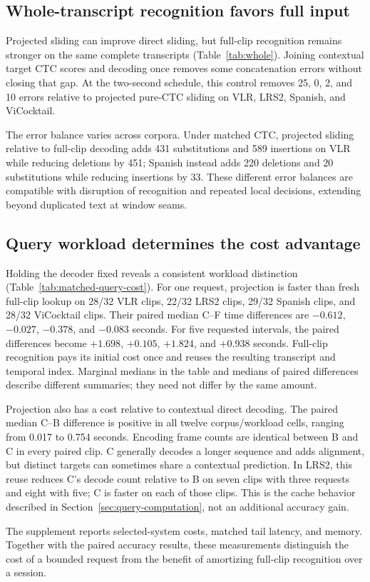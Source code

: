 \subsection{Whole-transcript recognition favors full input}

Projected sliding can improve direct sliding, but full-clip recognition
remains stronger on the same complete transcripts
(Table~\ref{tab:whole}). Joining contextual target CTC scores and decoding
once removes some concatenation errors without closing that gap.
At the two-second schedule, this control removes 25, 0, 2, and 10 errors
relative to projected pure-CTC sliding on VLR, LRS2, Spanish, and ViCocktail.

The error balance varies across corpora. Under matched CTC, projected sliding
relative to full-clip decoding
adds 431 substitutions and 589 insertions on VLR while reducing deletions
by 451; Spanish instead adds 220 deletions and 20 substitutions while reducing
insertions by 33. These different error balances are compatible with disruption
of recognition and repeated local decisions, extending beyond duplicated text
at window seams.

\subsection{Query workload determines the cost advantage}

Holding the decoder fixed reveals a consistent workload distinction
(Table~\ref{tab:matched-query-cost}). For one request, projection is faster
than fresh full-clip lookup on 28/32 VLR clips, 22/32 LRS2 clips, 29/32
Spanish clips, and 28/32 ViCocktail clips. Their paired median C--F time
differences are $-0.612$, $-0.027$, $-0.378$, and $-0.083$ seconds.
For five requested intervals, the paired differences become $+1.698$,
$+0.105$, $+1.824$, and $+0.938$ seconds. Full-clip recognition pays its
initial cost once and reuses the resulting transcript and temporal index.
Marginal medians in the table and medians of paired differences describe
different summaries; they need not differ by the same amount.

Projection also has a cost relative to contextual direct decoding. The paired
median C--B difference is positive in all twelve corpus/workload cells,
ranging from 0.017 to 0.754 seconds. Encoding frame counts are identical
between B and C in every paired clip. C generally decodes a longer sequence
and adds alignment, but distinct targets can sometimes share a contextual
prediction. In LRS2, this reuse reduces C's decode count relative to B on
seven clips with three requests and eight with five; C is faster on each of
those clips. This is the cache behavior described in
Section~\ref{sec:query-computation}, not an additional accuracy gain.

The supplement reports selected-system costs, matched tail latency, and memory.
Together with the paired accuracy results, these measurements distinguish the
cost of a bounded request from the benefit of amortizing full-clip recognition
over a session.
